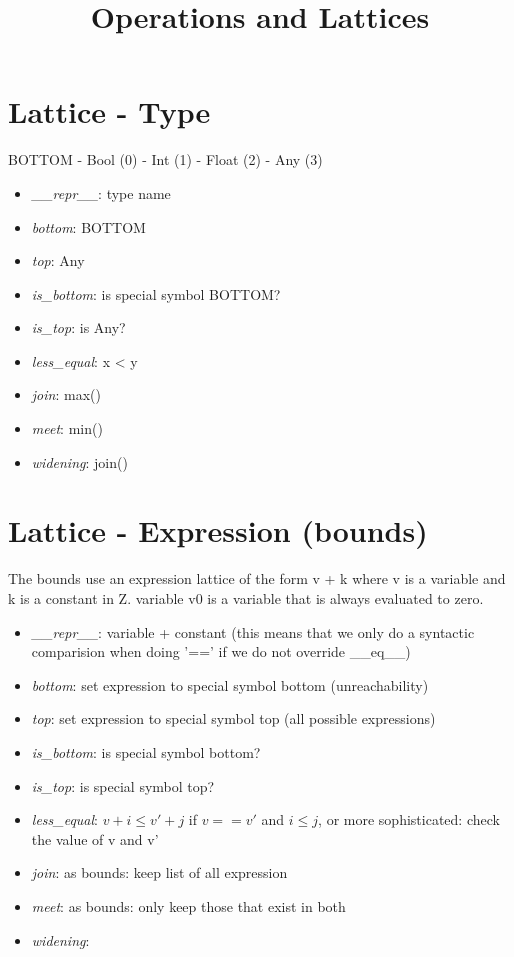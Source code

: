 \documentclass[11pt]{article}
\begin{document}
\title{Operations and Lattices}

\maketitle


\section{Lattice - Type}

BOTTOM - Bool (0) - Int (1) - Float (2) - Any (3)

\begin{itemize}
\item \textit{\_\_repr\_\_}: type name
\item \textit{bottom}: BOTTOM
\item \textit{top}: Any
\item \textit{is\_bottom}: is special symbol BOTTOM?
\item \textit{is\_top}: is Any?
\item \textit{less\_equal}: x < y
\item \textit{join}: max()
\item \textit{meet}: min()
\item \textit{widening}: join()
\end{itemize}

\section{Lattice - Expression (bounds)}

The bounds use an expression lattice of the form v + k where v is a variable and k is a constant in Z. variable v0 is a variable that is always evaluated to zero.

\begin{itemize}
\item \textit{\_\_repr\_\_}: variable + constant (this means that we only do a syntactic comparision when doing '==' if we do not override \_\_eq\_\_)
\item \textit{bottom}: set expression to special symbol bottom (unreachability)
\item \textit{top}: set expression to special symbol top (all possible expressions)
\item \textit{is\_bottom}: is special symbol bottom?
\item \textit{is\_top}: is special symbol top?
\item \textit{less\_equal}: $v + i \leq v' + j$ if $v == v'$ and $i \leq j$, or more sophisticated: check the value of v and v'
\item \textit{join}: as bounds: keep list of all expression
\item \textit{meet}: as bounds: only keep those that exist in both
\item \textit{widening}: 
\end{itemize}
\end{document}
